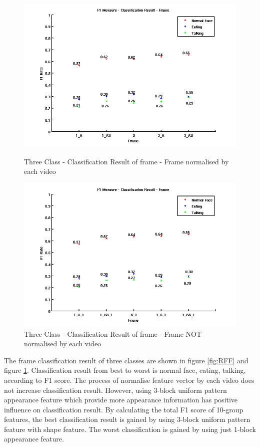 \begin{figure}[ht]
\centering
\begin{minipage}{.5\textwidth}
  \centering
  \captionsetup{justification=centering,margin=1cm}
  \includegraphics[width=\linewidth]{imgs/Result_F1_Frame.png}
  \caption{Three Class - Classification Result of frame - Frame normalised by each video}
  \label{fig:RFF}
\end{minipage}%
\begin{minipage}{.5\textwidth}
  \centering
  \captionsetup{justification=centering,margin=1cm}
  \includegraphics[width=\linewidth]{imgs/Result_F1_Frame_1.png}
  \caption{Three Class - Classification Result of frame - Frame NOT normalised by each video}
  \label{fig:RFF1}
\end{minipage}
\end{figure}
\newline
The frame classification result of three classes are shown in figure \ref{fig:RFF} and figure \ref{fig:RFF1}. Classification result from best to worst is normal face, eating, talking, according to F1 score. The process of normalise feature vector by each video does not increase classification result. However, using 3-block uniform pattern appearance feature which provide more appearance information has positive influence on classification result. By calculating the total F1 score of 10-group features, the best classification result is gained by using 3-block uniform pattern feature with shape feature. The worst classification is gained by using just 1-block appearance feature.

